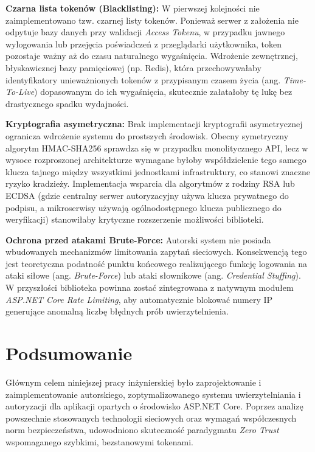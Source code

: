 \documentclass{SGGW-thesis}
\begin{document}
\textbf{Czarna lista tokenów (Blacklisting):} W pierwszej kolejności nie zaimplementowano tzw. czarnej listy tokenów. Ponieważ serwer z założenia nie odpytuje bazy danych przy walidacji \textit{Access Tokenu}, w przypadku jawnego wylogowania lub przejęcia poświadczeń z przeglądarki użytkownika, token pozostaje ważny aż do czasu naturalnego wygaśnięcia. Wdrożenie zewnętrznej, błyskawicznej bazy pamięciowej (np. Redis), która przechowywałaby identyfikatory unieważnionych tokenów z przypisanym czasem życia (ang. \textit{Time-To-Live}) dopasowanym do ich wygaśnięcia, skutecznie załatałoby tę lukę bez drastycznego spadku wydajności.

\textbf{Kryptografia asymetryczna:} Brak implementacji kryptografii asymetrycznej ogranicza wdrożenie systemu do prostszych środowisk. Obecny symetryczny algorytm HMAC-SHA256 sprawdza się w przypadku monolitycznego API, lecz w wysoce rozproszonej architekturze wymagane byłoby współdzielenie tego samego klucza tajnego między wszystkimi jednostkami infrastruktury, co stanowi znaczne ryzyko kradzieży. Implementacja wsparcia dla algorytmów z rodziny RSA lub ECDSA (gdzie centralny serwer autoryzacyjny używa klucza prywatnego do podpisu, a mikroserwisy używają ogólnodostępnego klucza publicznego do weryfikacji) stanowiłaby krytyczne rozszerzenie możliwości biblioteki.

\textbf{Ochrona przed atakami Brute-Force:} Autorski system nie posiada wbudowanych mechanizmów limitowania zapytań sieciowych. Konsekwencją tego jest teoretyczna podatność punktu końcowego realizującego funkcję logowania na ataki siłowe (ang. \textit{Brute-Force}) lub ataki słownikowe (ang. \textit{Credential Stuffing}). W przyszłości biblioteka powinna zostać zintegrowana z natywnym modułem \textit{ASP.NET Core Rate Limiting}, aby automatycznie blokować numery IP generujące anomalną liczbę błędnych prób uwierzytelnienia.

\clearpage

\section{Podsumowanie}

Głównym celem niniejszej pracy inżynierskiej było zaprojektowanie i zaimplementowanie autorskiego, zoptymalizowanego systemu uwierzytelniania i autoryzacji dla aplikacji opartych o środowisko ASP.NET Core. Poprzez analizę powszechnie stosowanych technologii sieciowych oraz wymagań współczesnych norm bezpieczeństwa, udowodniono skuteczność paradygmatu \textit{Zero Trust} wspomaganego szybkimi, bezstanowymi tokenami.
\end{document}
